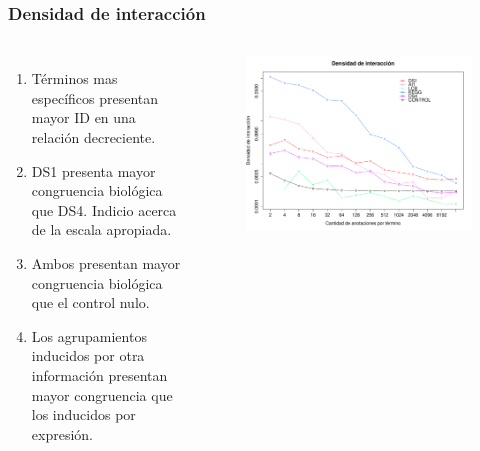 \documentclass[serif,9pt, t]{beamer}
\newcommand\Fontvi{\fontsize{7}{7.2}\selectfont}
\begin{document}
\begin{frame}\frametitle{Densidad de interacción} 
\begin{columns}[T]
	\Fontvi
	\begin{enumerate}
	\item Términos mas específicos presentan mayor ID en una relación decreciente.
	\item DS1 presenta mayor congruencia biológica que DS4. Indicio acerca de la escala apropiada.
	\item Ambos presentan mayor congruencia biológica que el control nulo.
	\item Los agrupamientos inducidos por otra información presentan mayor congruencia que los inducidos por expresión.
	\end{enumerate}
	\begin{figure}
	    	\centering
		\includegraphics[width=1\textwidth]{interacting_densities_bpb.pdf}
	\end{figure}
\end{columns}
\end{frame}
\end{document}
